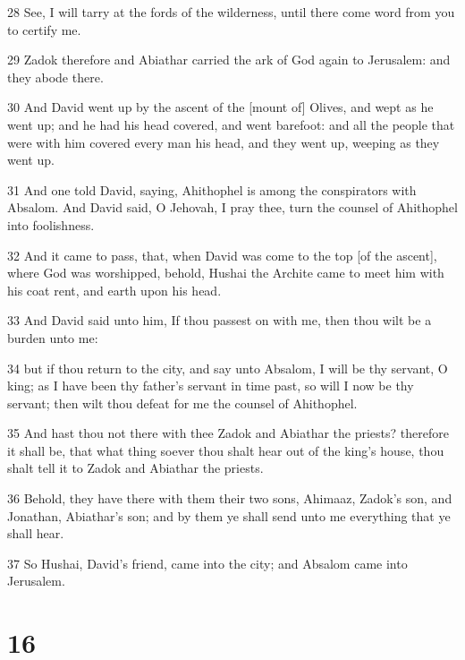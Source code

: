 \par 28 See, I will tarry at the fords of the wilderness, until there come word from you to certify me.
\par 29 Zadok therefore and Abiathar carried the ark of God again to Jerusalem: and they abode there.
\par 30 And David went up by the ascent of the [mount of] Olives, and wept as he went up; and he had his head covered, and went barefoot: and all the people that were with him covered every man his head, and they went up, weeping as they went up.
\par 31 And one told David, saying, Ahithophel is among the conspirators with Absalom. And David said, O Jehovah, I pray thee, turn the counsel of Ahithophel into foolishness.
\par 32 And it came to pass, that, when David was come to the top [of the ascent], where God was worshipped, behold, Hushai the Archite came to meet him with his coat rent, and earth upon his head.
\par 33 And David said unto him, If thou passest on with me, then thou wilt be a burden unto me:
\par 34 but if thou return to the city, and say unto Absalom, I will be thy servant, O king; as I have been thy father's servant in time past, so will I now be thy servant; then wilt thou defeat for me the counsel of Ahithophel.
\par 35 And hast thou not there with thee Zadok and Abiathar the priests? therefore it shall be, that what thing soever thou shalt hear out of the king's house, thou shalt tell it to Zadok and Abiathar the priests.
\par 36 Behold, they have there with them their two sons, Ahimaaz, Zadok's son, and Jonathan, Abiathar's son; and by them ye shall send unto me everything that ye shall hear.
\par 37 So Hushai, David's friend, came into the city; and Absalom came into Jerusalem.

\chapter{16}

